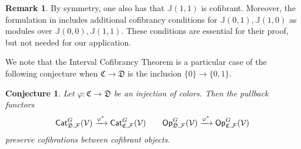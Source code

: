 \documentclass[a4paper,10pt
,draft
]{article}%
\numberwithin{equation}{section}
\numberwithin{figure}{section}
\newtheorem{conjecture}[equation]{Conjecture}%
\theoremstyle{definition} %
\newtheorem{remark}[equation]{Remark}%
\newcommand{\F}{\ensuremath{\mathcal F}}
\newcommand{\V}{\ensuremath{\mathcal V}}
\newcommand{\1}{\ensuremath{\mathbbm 1}}%
\begin{document}
\begin{remark}
By symmetry, one also has that $\mathbb{J}(1,1)$ is cofibrant.
Moreover, the formulation in \cite[Thm. 1.15]{BM13}
includes additional cofibrancy conditions for
$\mathbb{J}(0,1),\mathbb{J}(1,0)$
as modules over $\mathbb{J}(0,0),\mathbb{J}(1,1)$.
These conditions are essential for their proof, 
but not needed for our application.
\end{remark}




We note that the Interval Cofibrancy Theorem is a particular case of the following conjecture when $\mathfrak{C} \to \mathfrak{D}$
is the inclusion $\{0\} \to \{0,1\}$.


\begin{conjecture}\label{CATOP CONJ}
Let $\varphi \colon \mathfrak{C} \to \mathfrak{D}$
be an injection of colors.
Then the pullback functors
\[
	\mathsf{Cat}_{\mathfrak{D},\F}^G(\V)
	\xrightarrow{\varphi^{\**}}
	\mathsf{Cat}_{\mathfrak{C},\F}^G(\V)
\qquad
	\mathsf{Op}_{\mathfrak{D},\F}^G(\V)
	\xrightarrow{\varphi^{\**}}
	\mathsf{Op}_{\mathfrak{C},\F}^G(\V)
\]
preserve cofibrations between cofibrant objects.
\end{conjecture}
\end{document}
